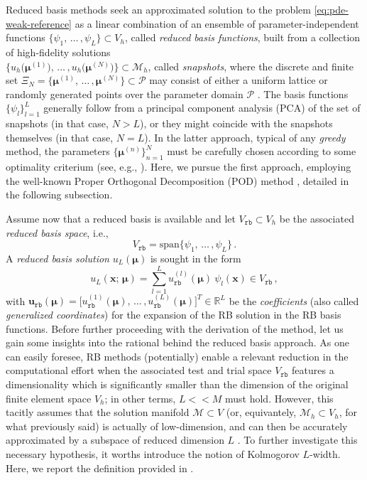 \documentclass[12pt, a4paper, twoside, openright]{report}
\numberwithin{equation}{chapter}
\theoremstyle{theorem}
\theoremstyle{definition}
\theoremstyle{remark}
\theoremstyle{proposition}
\numberwithin{figure}{chapter}
\newcommand{\bg}[1]{\boldsymbol{#1}}
\begin{document}
		Reduced basis methods seek an approximated solution to the problem \eqref{eq:pde-weak-reference} as a linear combination of an ensemble of parameter-independent functions $\big\lbrace \psi_1, \, \ldots \, , \psi_L \big\rbrace \subset V_h$, called \emph{reduced basis functions}, built from a collection of high-fidelity solutions \\ $\big\lbrace u_h \big( \bg{\mu}^{(1)} \big), \, \ldots \, , u_h \big( \bg{\mu}^{(N)} \big) \big\rbrace \subset \mathcal{M}_h$, called \emph{snapshots}, where the discrete and finite set $\Xi_N = \big\lbrace \bg{\mu}^{(1)}, \, \ldots \, , \bg{\mu}^{(N)} \big\rbrace \subset \mathcal{P}$ may consist of either a uniform lattice or randomly generated points over the parameter domain $\mathcal{P}$ \cite{HSR16}. The basis functions $\big\lbrace \psi_l \big\rbrace_{l = 1}^L$ generally follow from a principal component analysis (PCA) of the set of snapshots (in that case, $N > L$), or they might coincide with the snapshots themselves (in that case, $N = L$). In the latter approach, typical of any \emph{greedy} method, the parameters $\big\lbrace \bg{\mu}^{(n)} \big\rbrace_{n = 1}^N$ must be carefully chosen according to some optimality criterium (see, e.g., \cite{Chen17}). Here, we pursue the first approach, employing the well-known Proper Orthogonal Decomposition (POD) method \cite{Vol08}, detailed in the following subsection.
		
		Assume now that a reduced basis is available and let $V_{\texttt{rb}} \subset V_h$ be the associated \emph{reduced basis space}, i.e.,
		\begin{equation*}
			V_{\texttt{rb}} = \text{span} \big\lbrace \psi_1, \, \ldots \, , \psi_L \big\rbrace \, .
		\end{equation*} 
		A \emph{reduced basis solution} $u_{L}(\bg{\mu})$ is sought in the form
		\begin{equation}
			\label{eq:rb-solution}
			u_{L}(\bg{x}; \, \bg{\mu}) = \sum_{l = 1}^L u_{\texttt{rb}}^{(l)}(\bg{\mu}) ~ \psi_l(\bg{x}) \in V_{\texttt{rb}} \, ,
		\end{equation}
		with $\mathbf{u}_{\texttt{rb}}(\bg{\mu}) = \big[ u_{\texttt{rb}}^{(1)}(\bg{\mu}), \, \ldots \, , u_{\texttt{rb}}^{(L)}(\bg{\mu}) \big]^T \in \mathbb{R}^L$ be the \emph{coefficients} (also called \emph{generalized coordinates}) for the expansion of the RB solution in the RB basis functions. Before further proceeding with the derivation of the method, let us gain some insights into the rational behind the reduced basis approach. As one can easily foresee, RB methods (potentially) enable a relevant reduction in the computational effort when the associated test and trial space $V_{\texttt{rb}}$ features a dimensionality which is significantly smaller than the dimension of the original finite element space $V_h$; in other terms, $L << M$ must hold. However, this tacitly assumes that the solution manifold $\mathcal{M} \subset V$ (or, equivantely, $\mathcal{M}_h \subset V_h$, for what previously said) is actually of low-dimension, and can then be accurately approximated by a subspace of reduced dimension $L$ \cite{HSR16}. To further investigate this necessary hypothesis, it worths introduce the notion of Kolmogorov $L$-width. Here, we report the definition provided in \cite{Mad06}.
		
\end{document}

